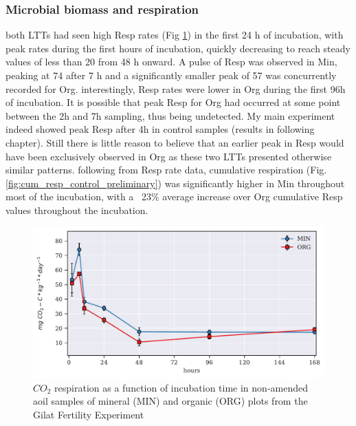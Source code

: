         \subsubsection{Microbial biomass and respiration}
            both LTTs had seen high Resp rates (Fig \ref{fig:resp_control_preliminary}) in the first 24 h of incubation, with peak rates during the first hours of incubation, quickly decreasing to reach steady values of less than 20 \respunit from 48 h onward. A pulse of Resp was observed in Min, peaking at 74   \respunit after 7 h and a significantly smaller peak of 57 \respunit was concurrently recorded for Org. interestingly, Resp rates were lower in Org during the first 96h of incubation. It is possible that peak Resp for Org had occurred at some point between the 2h and 7h  sampling, thus being undetected. My main experiment indeed showed peak Resp after 4h in control samples (results in following chapter). Still there is little reason to believe that an earlier peak in Resp would have been exclusively observed in Org as these two LTTs presented otherwise similar patterns.
            following from Resp rate data, cumulative respiration (Fig. \ref{fig:cum_resp_control_preliminary}) was significantly higher in Min throughout most of the incubation, with a ~23$\%$ average increase over Org cumulative Resp values throughout the incubation.\\

  			 \begin{figure}[H]
  				\centering
  				\includegraphics[scale=0.8]{thesis_figures/preliminary/control/Resp.pdf}
  				\caption{$CO_2$ respiration as a function of incubation time in non-amended aoil samples of mineral (MIN) and organic (ORG) plots from the Gilat Fertility Experiment}
  				\label{fig:resp_control_preliminary}
  			\end{figure}

